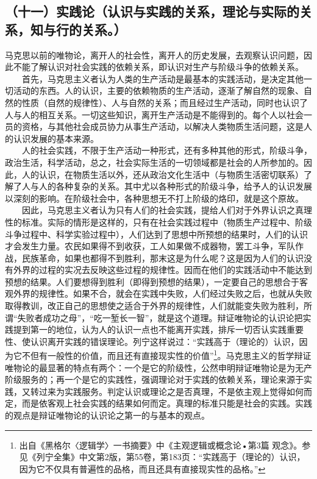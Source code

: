 \documentclass[cn,11pt,chinese]{elegantbook}
\def\myformat#1{\hfil\hfil #1}
\begin{document}
\subsection*{\myformat{（十一）实践论（认识与实践的关系，理论与实际的关系，知与行的关系。）}}
马克思以前的唯物论，离开人的社会性，离开人的历史发展，去观察认识问题，因此不能了解认识对社会实践的依赖关系，即认识对生产与阶级斗争的依赖关系。\\
　　首先，马克思主义者认为人类的生产活动是最基本的实践活动，是决定其他一切活动的东西。人的认识，主要的依赖物质的生产活动，逐渐了解自然的现象、自然的性质（自然的规律性）、人与自然的关系；而且经过生产活动，同时也认识了人与人的相互关系。一切这些知识，离开生产活动是不能得到的。每个人以社会一员的资格，与其他社会成员协力从事生产活动，以解决人类物质生活问题，这是人的认识发展的基本来源。\\
　　人的社会实践，不限于生产活动一种形式，还有多种其他的形式，阶级斗争，政治生活，科学活动，总之，社会实际生活的一切领域都是社会的人所参加的。因此，人的认识，在物质生活以外，还从政治文化生活中（与物质生活密切联系）了解了人与人的各种复杂的关系。其中尤以各种形式的阶级斗争，给予人的认识发展以深刻的影响。在阶级社会中，各种思想无不打上阶级的烙印，就是这个原故。\\
　　因此，马克思主义者认为只有人们的社会实践，提给人们对于外界认识之真理性的标准。实际的情形是这样的，只有在社会实践过程中（物质生产过程中、阶级斗争过程中、科学实验过程中），人们达到了思想中所预想的结果时，人们的认识才会发生力量。农民如果得不到收获，工人如果做不成器物，罢工斗争，军队作战，民族革命，如果也都得不到胜利，那末这是为什么呢？这是因为人们的认识没有外界的过程的实况去反映这些过程的规律性。因而在他们的实践活动中不能达到预想的结果。人们要想得到胜利（即得到预想的结果），一定要自己的思想合于客观外界的规律性。如果不合，就会在实践中失败，人们经过失败之后，也就从失败取得教训，改正自己的思想使之适合于外界的规律性，人们就能变失败为胜利，所谓“失败者成功之母”，“吃一堑长一智”，就是这个道理。辩证唯物论的认识论把实践提到第一的地位，认为人的认识一点也不能离开实践，排斥一切否认实践重要性、使认识离开实践的错误理论。列宁这样说过：“实践高于（理论的）认识，因为它不但有一般性的价值，而且还有直接现实性的价值”\footnote[20]{ 出自《黑格尔〈逻辑学〉一书摘要》中《主观逻辑或概念论•第3篇 观念》。参见《列宁全集》中文第2版，第55卷，第183页：“实践高于（理论的）认识，因为它不仅具有普遍性的品格，而且还具有直接现实性的品格。”}。马克思主义的哲学辩证唯物论的最显著的特点有两个：一个是它的阶级性，公然申明辩证唯物论是为无产阶级服务的；再一个是它的实践性，强调理论对于实践的依赖关系，理论来源于实践，又转过来为实践服务。判定认识或理论之是否真理，不是依主观上觉得如何而定，而是依客观上社会实践的结果如何而定。真理的标准只能是社会的实践。实践的观点是辩证唯物论的认识论之第一的与基本的观点。\\
\end{document}
